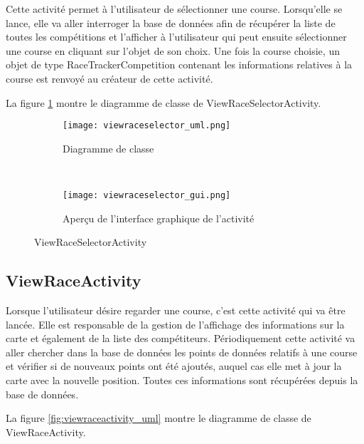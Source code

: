 Cette activité permet à l'utilisateur de sélectionner une course. Lorsqu'elle se lance, elle va aller interroger la base de données afin de récupérer la liste de toutes les compétitions et l'afficher à l'utilisateur qui peut ensuite sélectionner une course en cliquant sur l'objet de son choix. Une fois la course choisie, un objet de type RaceTrackerCompetition contenant les informations relatives à la course est renvoyé au créateur de cette activité.

La figure \ref{fig:viewraceselector_uml} montre le diagramme de classe de ViewRaceSelectorActivity.

\begin{figure}[htb!]
    \centering
    \begin{subfigure}[htb]{0.49\textwidth}
		\texttt{[image: viewraceselector\_uml.png]} 
		\caption{Diagramme de classe}
		\label{fig:viewraceselector_uml}
    \end{subfigure}
    ~ %
    \begin{subfigure}[htb]{0.49\textwidth}
		\texttt{[image: viewraceselector\_gui.png]} 
		\caption{Aperçu de l'interface graphique de l'activité}
		\label{fig:viewraceselector_gui}
    \end{subfigure}
    \caption{ViewRaceSelectorActivity}\label{fig:viewraceselector_fig}
\end{figure}

\subsection{ViewRaceActivity}

Lorsque l'utilisateur désire regarder une course, c'est cette activité qui va être lancée. Elle est responsable de la gestion de l'affichage des informations sur la carte et également de la liste des compétiteurs. Périodiquement cette activité va aller chercher dans la base de données les points de données relatifs à une course et vérifier si de nouveaux points ont été ajoutés, auquel cas elle met à jour la carte avec la nouvelle position. Toutes ces informations sont récupérées depuis la base de données.

La figure \ref{fig:viewraceactivity_uml} montre le diagramme de classe de ViewRaceActivity.


